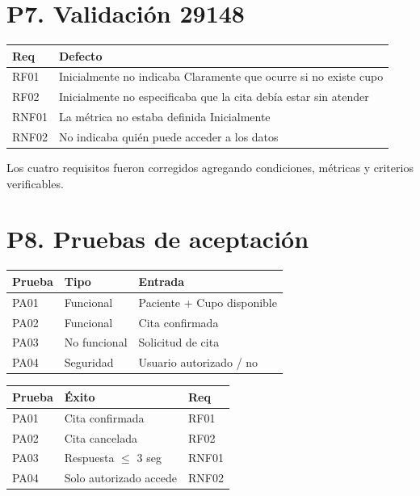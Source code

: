 \documentclass[11pt,a4paper,oneside]{article}
\begin{document}
\section*{P7. Validación 29148}

\begin{tabular}{|p{}|p{}|}
\hline
\textbf{Req} & \textbf{Defecto} \\ \hline
RF01 & Inicialmente no indicaba Claramente que ocurre si no existe cupo \\ \hline
RF02 & Inicialmente no especificaba que la cita debía estar sin atender \\ \hline
RNF01 & La métrica no estaba definida Inicialmente \\ \hline
RNF02 & No indicaba quién puede acceder a los datos \\ \hline
\end{tabular}

\vspace{0.3cm}

Los cuatro requisitos fueron corregidos agregando condiciones, métricas y criterios verificables.

\section*{P8. Pruebas de aceptación}

\begin{tabular}{|p{}|p{}|p{}|}
\hline
\textbf{Prueba} & \textbf{Tipo} & \textbf{Entrada} \\ \hline
PA01 & Funcional & Paciente + Cupo disponible \\ \hline
PA02 & Funcional & Cita confirmada \\ \hline
PA03 & No funcional & Solicitud de cita \\ \hline
PA04 & Seguridad & Usuario autorizado / no \\ \hline
\end{tabular}

\vspace{0.3cm}

\begin{tabular}{|p{}|p{}|p{}|}
\hline
\textbf{Prueba} & \textbf{Éxito} & \textbf{Req} \\ \hline
PA01 & Cita confirmada & RF01 \\ \hline
PA02 & Cita cancelada & RF02 \\ \hline
PA03 & Respuesta $\leq$ 3 seg & RNF01 \\ \hline
PA04 & Solo autorizado accede & RNF02 \\ \hline
\end{tabular}
\end{document}
